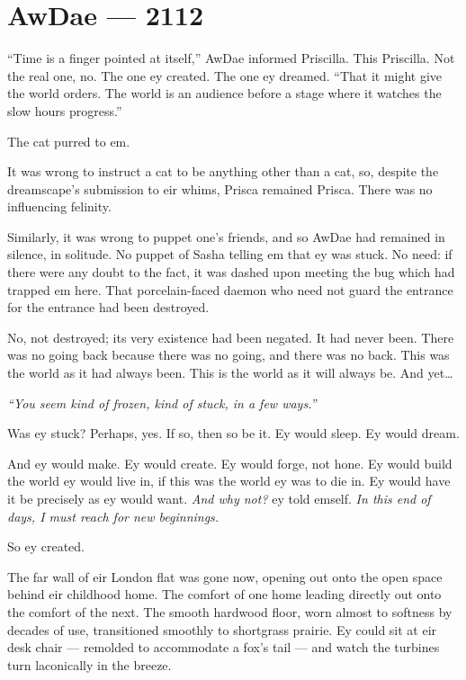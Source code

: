 \hypertarget{rj-brewster-2112}{%
\chapter*{AwDae — 2112}\label{rj-brewster-2112}}

``Time is a finger pointed at itself,'' AwDae informed Priscilla. This Priscilla. Not the real one, no. The one ey created. The one ey dreamed. ``That it might give the world orders. The world is an audience before a stage where it watches the slow hours progress.''

The cat purred to em.

It was wrong to instruct a cat to be anything other than a cat, so, despite the dreamscape's submission to eir whims, Prisca remained Prisca. There was no influencing felinity.

Similarly, it was wrong to puppet one's friends, and so AwDae had remained in silence, in solitude. No puppet of Sasha telling em that ey was stuck. No need: if there were any doubt to the fact, it was dashed upon meeting the bug which had trapped em here. That porcelain-faced daemon who need not guard the entrance for the entrance had been destroyed.

No, not destroyed; its very existence had been negated. It had never been. There was no going back because there was no going, and there was no back. This was the world as it had always been. This is the world as it will always be. And yet\ldots{}

\emph{``You seem kind of frozen, kind of stuck, in a few ways.''}

Was ey stuck? Perhaps, yes. If so, then so be it. Ey would sleep. Ey would dream.

And ey would make. Ey would create. Ey would forge, not hone. Ey would build the world ey would live in, if this was the world ey was to die in. Ey would have it be precisely as ey would want. \emph{And why not?} ey told emself. \emph{In this end of days, I must reach for new beginnings.}

So ey created.

The far wall of eir London flat was gone now, opening out onto the open space behind eir childhood home. The comfort of one home leading directly out onto the comfort of the next. The smooth hardwood floor, worn almost to softness by decades of use, transitioned smoothly to shortgrass prairie. Ey could sit at eir desk chair — remolded to accommodate a fox's tail — and watch the turbines turn laconically in the breeze.

